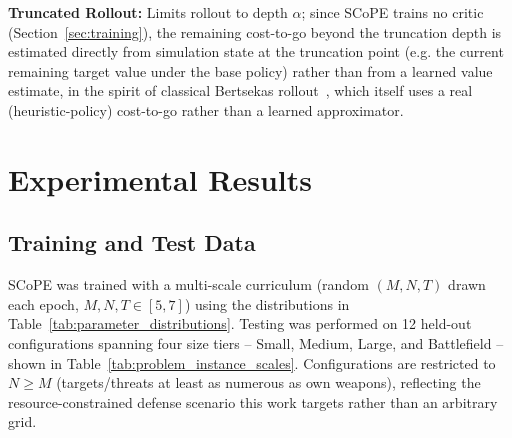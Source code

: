\documentclass[smallcondensed]{svjour3}
\begin{document}
\textbf{Truncated Rollout:} Limits rollout to depth $\alpha$; since SCoPE trains no critic (Section~\ref{sec:training}), the remaining cost-to-go beyond the truncation depth is estimated directly from simulation state at the truncation point (e.g. the current remaining target value under the base policy) rather than from a learned value estimate, in the spirit of classical Bertsekas rollout~\cite{bertsekas1997rollout}, which itself uses a real (heuristic-policy) cost-to-go rather than a learned approximator.


\section{Experimental Results}
\label{sec:results}

\subsection{Training and Test Data}

SCoPE was trained with a multi-scale curriculum (random $(M,N,T)$ drawn each epoch, $M,N,T \in [5,7]$) using the distributions in Table~\ref{tab:parameter_distributions}. Testing was performed on 12 held-out configurations spanning four size tiers -- Small, Medium, Large, and Battlefield -- shown in Table~\ref{tab:problem_instance_scales}. Configurations are restricted to $N \geq M$ (targets/threats at least as numerous as own weapons), reflecting the resource-constrained defense scenario this work targets rather than an arbitrary grid. %

\end{document}
